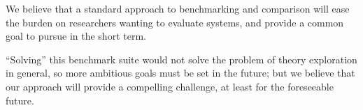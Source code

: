 We believe that a standard approach to benchmarking and comparison will ease the
burden on researchers wanting to evaluate systems, and provide a common goal to
pursue in the short term.

``Solving'' this benchmark suite would not solve the problem of theory
exploration in general, so more ambitious goals must be set in the future; but
we believe that our approach will provide a compelling challenge, at least for
the foreseeable future.

%





